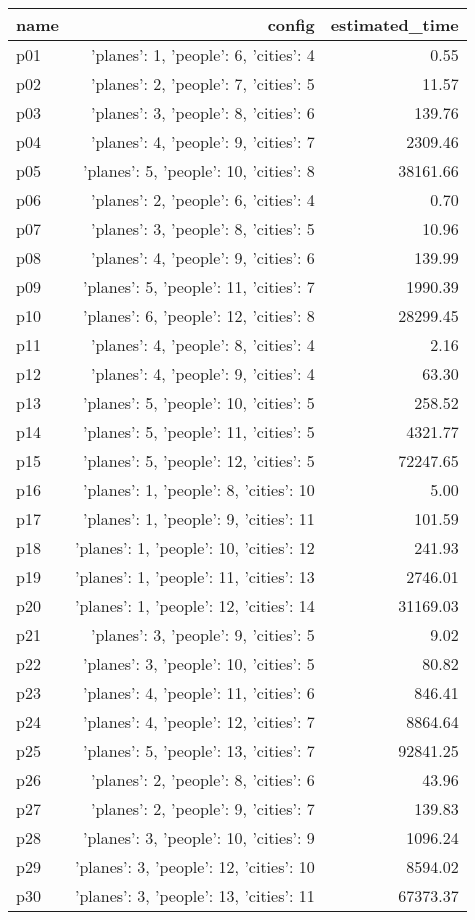 \documentclass{article}
\begin{document}
                            \begin{center}
                            \scriptsize
                            \begin{tabular}{@{}l|r|r@{}}
                            name & config & estimated\_time\\\midrule
                              p01&{'planes': 1, 'people': 6, 'cities': 4}&0.55\\
  p02&{'planes': 2, 'people': 7, 'cities': 5}&11.57\\
  p03&{'planes': 3, 'people': 8, 'cities': 6}&139.76\\
  p04&{'planes': 4, 'people': 9, 'cities': 7}&2309.46\\
  p05&{'planes': 5, 'people': 10, 'cities': 8}&38161.66\\
  p06&{'planes': 2, 'people': 6, 'cities': 4}&0.70\\
  p07&{'planes': 3, 'people': 8, 'cities': 5}&10.96\\
  p08&{'planes': 4, 'people': 9, 'cities': 6}&139.99\\
  p09&{'planes': 5, 'people': 11, 'cities': 7}&1990.39\\
  p10&{'planes': 6, 'people': 12, 'cities': 8}&28299.45\\
  p11&{'planes': 4, 'people': 8, 'cities': 4}&2.16\\
  p12&{'planes': 4, 'people': 9, 'cities': 4}&63.30\\
  p13&{'planes': 5, 'people': 10, 'cities': 5}&258.52\\
  p14&{'planes': 5, 'people': 11, 'cities': 5}&4321.77\\
  p15&{'planes': 5, 'people': 12, 'cities': 5}&72247.65\\
  p16&{'planes': 1, 'people': 8, 'cities': 10}&5.00\\
  p17&{'planes': 1, 'people': 9, 'cities': 11}&101.59\\
  p18&{'planes': 1, 'people': 10, 'cities': 12}&241.93\\
  p19&{'planes': 1, 'people': 11, 'cities': 13}&2746.01\\
  p20&{'planes': 1, 'people': 12, 'cities': 14}&31169.03\\
  p21&{'planes': 3, 'people': 9, 'cities': 5}&9.02\\
  p22&{'planes': 3, 'people': 10, 'cities': 5}&80.82\\
  p23&{'planes': 4, 'people': 11, 'cities': 6}&846.41\\
  p24&{'planes': 4, 'people': 12, 'cities': 7}&8864.64\\
  p25&{'planes': 5, 'people': 13, 'cities': 7}&92841.25\\
  p26&{'planes': 2, 'people': 8, 'cities': 6}&43.96\\
  p27&{'planes': 2, 'people': 9, 'cities': 7}&139.83\\
  p28&{'planes': 3, 'people': 10, 'cities': 9}&1096.24\\
  p29&{'planes': 3, 'people': 12, 'cities': 10}&8594.02\\
  p30&{'planes': 3, 'people': 13, 'cities': 11}&67373.37
                            \end{tabular}
                            \end{center}
\end{document}
